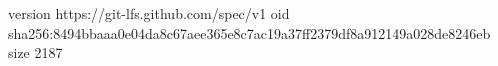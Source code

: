 version https://git-lfs.github.com/spec/v1
oid sha256:8494bbaaa0e04da8c67aee365e8c7ac19a37ff2379df8a912149a028de8246eb
size 2187

